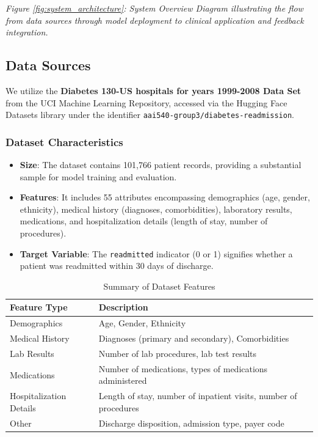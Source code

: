 \documentclass{article}
\begin{document}
\textit{Figure \ref{fig:system_architecture}: System Overview Diagram illustrating the flow from data sources through model deployment to clinical application and feedback integration.}

\subsection{Data Sources}

We utilize the \textbf{Diabetes 130-US hospitals for years 1999-2008 Data Set} from the UCI Machine Learning Repository, accessed via the Hugging Face Datasets library under the identifier \texttt{aai540-group3/diabetes-readmission}.

\subsubsection{Dataset Characteristics}

\begin{itemize}[leftmargin=*]
    \item \textbf{Size}: The dataset contains 101,766 patient records, providing a substantial sample for model training and evaluation.
    \item \textbf{Features}: It includes 55 attributes encompassing demographics (age, gender, ethnicity), medical history (diagnoses, comorbidities), laboratory results, medications, and hospitalization details (length of stay, number of procedures).
    \item \textbf{Target Variable}: The \texttt{readmitted} indicator (0 or 1) signifies whether a patient was readmitted within 30 days of discharge.
\end{itemize}

\begin{table}[H]
\centering
\caption{Summary of Dataset Features}
\label{tab:dataset_features}
\begin{tabular}{p{3cm} p{10cm}}
\toprule
\textbf{Feature Type} & \textbf{Description} \\
\midrule
Demographics & Age, Gender, Ethnicity \\
Medical History & Diagnoses (primary and secondary), Comorbidities \\
Lab Results & Number of lab procedures, lab test results \\
Medications & Number of medications, types of medications administered \\
Hospitalization Details & Length of stay, number of inpatient visits, number of procedures \\
Other & Discharge disposition, admission type, payer code \\
\bottomrule
\end{tabular}
\end{table}
\end{document}
